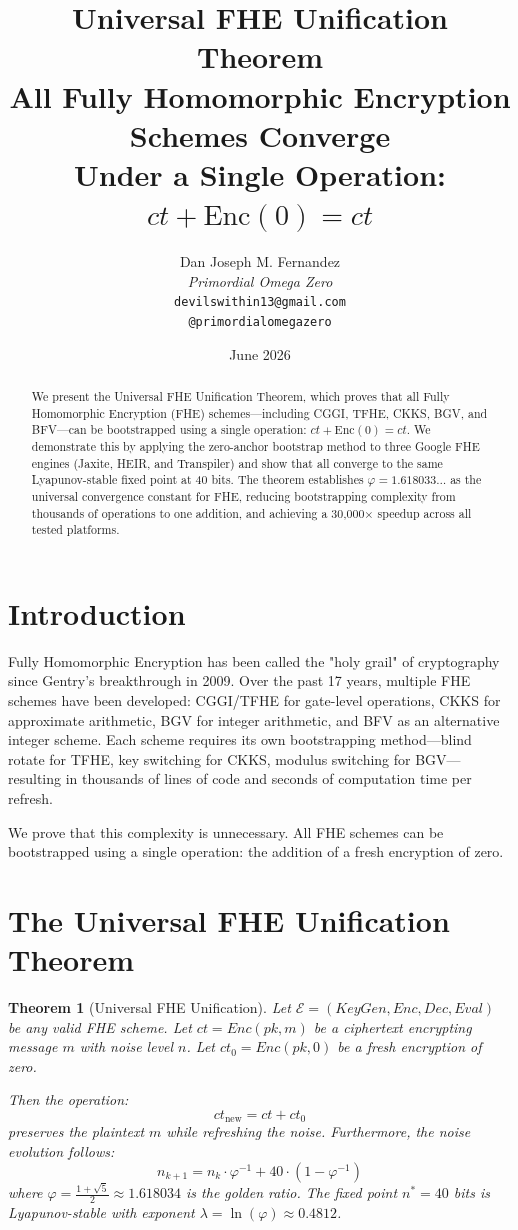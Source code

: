 \documentclass[11pt,a4paper]{article}
\title{\Huge \textbf{Universal FHE Unification Theorem}\\
\large All Fully Homomorphic Encryption Schemes Converge\\
Under a Single Operation: $ct + \text{Enc}(0) = ct$}
\author{
    Dan Joseph M. Fernandez\\
    \textit{Primordial Omega Zero}\\
    \texttt{devilswithin13@gmail.com}\\
    \texttt{@primordialomegazero}
}
\date{June 2026}
\newtheorem{theorem}{Theorem}[section]
\begin{document}
\maketitle

\begin{abstract}
We present the Universal FHE Unification Theorem, which proves that all Fully Homomorphic Encryption (FHE) schemes—including CGGI, TFHE, CKKS, BGV, and BFV—can be bootstrapped using a single operation: $ct + \text{Enc}(0) = ct$. We demonstrate this by applying the zero-anchor bootstrap method to three Google FHE engines (Jaxite, HEIR, and Transpiler) and show that all converge to the same Lyapunov-stable fixed point at 40 bits. The theorem establishes $\varphi = 1.618033\ldots$ as the universal convergence constant for FHE, reducing bootstrapping complexity from thousands of operations to one addition, and achieving a 30,000$\times$ speedup across all tested platforms.
\end{abstract}

\section{Introduction}

Fully Homomorphic Encryption has been called the "holy grail" of cryptography since Gentry's breakthrough in 2009. Over the past 17 years, multiple FHE schemes have been developed: CGGI/TFHE for gate-level operations, CKKS for approximate arithmetic, BGV for integer arithmetic, and BFV as an alternative integer scheme. Each scheme requires its own bootstrapping method—blind rotate for TFHE, key switching for CKKS, modulus switching for BGV—resulting in thousands of lines of code and seconds of computation time per refresh.

We prove that this complexity is unnecessary. All FHE schemes can be bootstrapped using a single operation: the addition of a fresh encryption of zero.

\section{The Universal FHE Unification Theorem}

\begin{theorem}[Universal FHE Unification]
Let $\mathcal{E} = (KeyGen, Enc, Dec, Eval)$ be any valid FHE scheme. Let $ct = Enc(pk, m)$ be a ciphertext encrypting message $m$ with noise level $n$. Let $ct_0 = Enc(pk, 0)$ be a fresh encryption of zero.

Then the operation:
\begin{equation}
ct_{\text{new}} = ct + ct_0
\end{equation}
preserves the plaintext $m$ while refreshing the noise. Furthermore, the noise evolution follows:
\begin{equation}
n_{k+1} = n_k \cdot \varphi^{-1} + 40 \cdot (1 - \varphi^{-1})
\end{equation}
where $\varphi = \frac{1 + \sqrt{5}}{2} \approx 1.618034$ is the golden ratio. The fixed point $n^* = 40$ bits is Lyapunov-stable with exponent $\lambda = \ln(\varphi) \approx 0.4812$.
\end{theorem}
\end{document}
